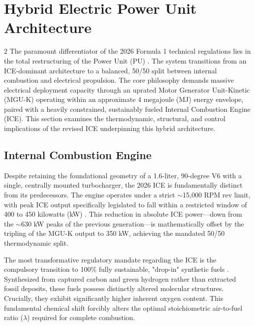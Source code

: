 \section{Hybrid Electric Power Unit Architecture}

\begin{multicols}{2}
The paramount differentiator of the 2026 Formula 1 technical regulations lies in the total restructuring of the Power Unit (PU) \cite{FIA_2026_PU_Regulations}. The system transitions from an ICE-dominant architecture to a balanced, 50/50 split between internal combustion and electrical propulsion. The core philosophy demands massive electrical deployment capacity through an uprated Motor Generator Unit-Kinetic (MGU-K) operating within an approximate 4 megajoule (MJ) energy envelope, paired with a heavily constrained, sustainably fueled Internal Combustion Engine (ICE). This section examines the thermodynamic, structural, and control implications of the revised ICE underpinning this hybrid architecture.

\subsection{Internal Combustion Engine}

Despite retaining the foundational geometry of a 1.6-liter, 90-degree V6 with a single, centrally mounted turbocharger, the 2026 ICE is fundamentally distinct from its predecessors. The engine operates under a strict $\sim$15,000 RPM rev limit, with peak ICE output specifically legislated to fall within a restricted window of 400 to 450 kilowatts (kW) \cite{FIA_2026_PU_Regulations}. This reduction in absolute ICE power—down from the $\sim$630 kW peaks of the previous generation—is mathematically offset by the tripling of the MGU-K output to 350 kW, achieving the mandated 50/50 thermodynamic split.

The most transformative regulatory mandate regarding the ICE is the compulsory transition to 100\% fully sustainable, "drop-in" synthetic fuels \cite{FIA_2026_PU_Regulations}. Synthesized from captured carbon and green hydrogen rather than extracted fossil deposits, these fuels possess distinctly altered molecular structures. Crucially, they exhibit significantly higher inherent oxygen content. This fundamental chemical shift forcibly alters the optimal stoichiometric air-to-fuel ratio ($\lambda$) required for complete combustion. 
\end{multicols}

